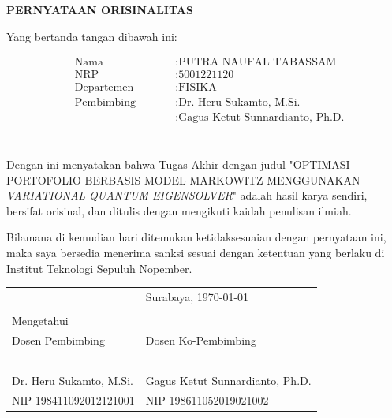 \begin{center}
	\large
	\textbf{PERNYATAAN ORISINALITAS}
\end{center}


\vspace{2ex}


\noindent Yang bertanda tangan dibawah ini:

\begin{minipage}{5cm}
	\begin{align*}
		&\text{Nama} \qquad &&: \text{PUTRA NAUFAL TABASSAM} \\
		&\text{NRP} \qquad &&: \text{5001221120} \\
		&\text{Departemen} \qquad &&: \text{FISIKA} \\
		&\text{Pembimbing} \qquad &&: \text{Dr. Heru Sukamto, M.Si.} \\
		& \qquad &&: \text{Gagus Ketut Sunnardianto, Ph.D.} \\
	\end{align*}
\end{minipage} \\

Dengan ini menyatakan bahwa Tugas Akhir dengan judul "OPTIMASI PORTOFOLIO BERBASIS MODEL MARKOWITZ MENGGUNAKAN \textit{VARIATIONAL QUANTUM EIGENSOLVER}" adalah hasil karya sendiri, bersifat orisinal, dan ditulis dengan mengikuti kaidah penulisan ilmiah.

Bilamana di kemudian hari ditemukan ketidaksesuaian dengan pernyataan ini, maka saya bersedia menerima sanksi sesuai dengan ketentuan yang berlaku di Institut Teknologi Sepuluh Nopember.

\vspace{8ex}

\noindent\begin{tabularx}{\textwidth}{X l}
	& Surabaya, \today \\
	& \\
	Mengetahui & \\
	Dosen Pembimbing & Dosen Ko-Pembimbing\\
	& \\
	& \\
	& \\
	& \\
	& \\
	Dr. Heru Sukamto, M.Si. & Gagus Ketut Sunnardianto, Ph.D. \\
	NIP 198411092012121001 & NIP 198611052019021002\\
\end{tabularx}


